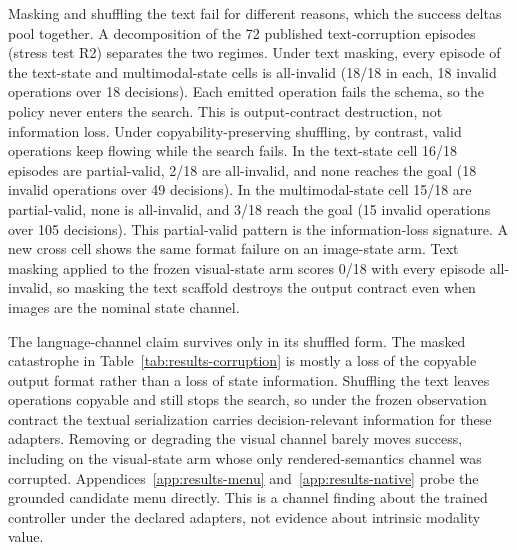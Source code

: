 Masking and shuffling the text fail for different reasons, which the success deltas pool together. A decomposition of the 72 published text-corruption episodes (stress test R2) separates the two regimes. Under text masking, every episode of the text-state and multimodal-state cells is all-invalid (18/18 in each, 18 invalid operations over 18 decisions). Each emitted operation fails the schema, so the policy never enters the search. This is output-contract destruction, not information loss. Under copyability-preserving shuffling, by contrast, valid operations keep flowing while the search fails. In the text-state cell 16/18 episodes are partial-valid, 2/18 are all-invalid, and none reaches the goal (18 invalid operations over 49 decisions). In the multimodal-state cell 15/18 are partial-valid, none is all-invalid, and 3/18 reach the goal (15 invalid operations over 105 decisions). This partial-valid pattern is the information-loss signature. A new cross cell shows the same format failure on an image-state arm. Text masking applied to the frozen visual-state arm scores 0/18 with every episode all-invalid, so masking the text scaffold destroys the output contract even when images are the nominal state channel.

The language-channel claim survives only in its shuffled form. The masked catastrophe in Table~\ref{tab:results-corruption} is mostly a loss of the copyable output format rather than a loss of state information. Shuffling the text leaves operations copyable and still stops the search, so under the frozen observation contract the textual serialization carries decision-relevant information for these adapters. Removing or degrading the visual channel barely moves success, including on the visual-state arm whose only rendered-semantics channel was corrupted. Appendices~\ref{app:results-menu} and~\ref{app:results-native} probe the grounded candidate menu directly. This is a channel finding about the trained controller under the declared adapters, not evidence about intrinsic modality value.


